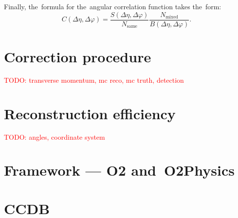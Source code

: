 \documentclass[11pt,a4paper,twoside]{book}
\numberwithin{equation}{chapter}
\newcommand{\todo}[1]{\textcolor{red}{TODO: #1}}
\begin{document}
Finally, the formula for the angular correlation function takes the form:
\begin{equation}
    C(\Delta\eta, \Delta\varphi) = \frac{S(\Delta\eta, \Delta\varphi)}{N_{\text{same}}} \frac{N_{\text{mixed}}}{B(\Delta\eta, \Delta\varphi)}.
\end{equation}

\section{Correction procedure}

\todo{transverse momentum, mc reco, mc truth, detection}

\section{Reconstruction efficiency}

\todo{angles, coordinate system}

\section{Framework — O2 and O2Physics}

\cite{alice-o2}

\section{CCDB}




\listoffigures
\listoftables

\appendix
\end{document}
